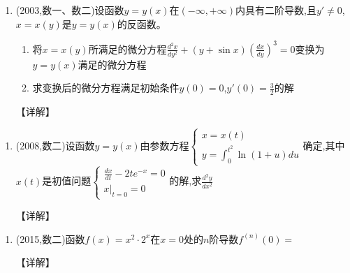 \documentclass[12pt, a4paper, oneside, UTF8]{ctexbook}
\begin{document}
\begin{enumerate}[label=\arabic*.,start=7]
    \item (2003,数一、数二)设函数$y=y(x)$在$(-\infty,+\infty)$内具有二阶导数,且$y'\neq0$,$x=x(y)$是$y=y(x)$的反函数。
    \begin{enumerate}[label=(\roman*)]
        \item 将$x=x(y)$所满足的微分方程$\frac{d^2x}{dy^2}+(y+\sin x)\left(\frac{dx}{dy}\right)^3=0$变换为$y=y(x)$满足的微分方程
        \item 求变换后的微分方程满足初始条件$y(0)=0$,$y'(0)=\frac{3}{2}$的解
    \end{enumerate}
    
    \begin{solution}
    【详解】
    \end{solution}
\end{enumerate}

\begin{remark}
\end{remark}

\begin{enumerate}[label=\arabic*.,start=8]
    \item (2008,数二)设函数$y=y(x)$由参数方程$\begin{cases}
        x=x(t) \\
        y=\int_0^{t^2}\ln(1+u)du
    \end{cases}$确定,其中$x(t)$是初值问题$\begin{cases}
        \frac{dx}{dt}-2te^{-x}=0 \\
        x|_{t=0}=0
    \end{cases}$的解,求$\frac{d^2y}{dx^2}$
    
    \begin{solution}
    【详解】
    \end{solution}
\end{enumerate}

\begin{remark}
\end{remark}

\begin{enumerate}[label=\arabic*.,start=9]
    \item (2015,数二)函数$f(x)=x^2\cdot2^x$在$x=0$处的$n$阶导数$f^{(n)}(0)=$\underline{\quad}
    
    \begin{solution}
    【详解】
    \end{solution}
\end{enumerate}
\end{document}
